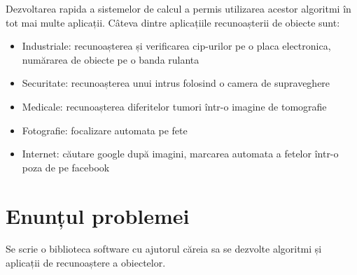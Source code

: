 Dezvoltarea rapida a sistemelor de calcul a permis utilizarea acestor algoritmi în tot mai multe aplicații. Câteva dintre aplicațiile recunoașterii de obiecte sunt:
\begin{itemize}
	\item Industriale: recunoașterea și verificarea cip-urilor pe o placa electronica, numărarea de obiecte pe o banda rulanta
	\item Securitate: recunoașterea unui intrus folosind o camera de supraveghere
	\item Medicale: recunoașterea diferitelor tumori într-o imagine de tomografie
	\item Fotografie: focalizare automata pe fete
	\item Internet: căutare google după imagini, marcarea automata a fetelor într-o poza de pe facebook
\end{itemize}



















\section{Enunțul problemei}
Se scrie o biblioteca software cu ajutorul căreia sa se dezvolte algoritmi și aplicații de recunoaștere a obiectelor.

